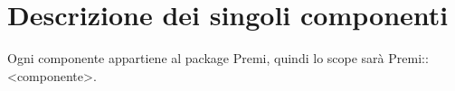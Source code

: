 
    \section{Descrizione dei singoli componenti}{
    	Ogni componente appartiene al package Premi, quindi lo scope sarà Premi::<componente>.}
